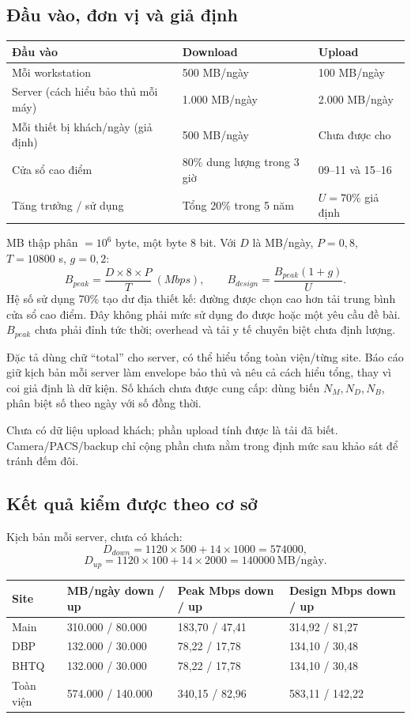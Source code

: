 \documentclass[
  11pt,
]{article}
\begin{document}
\subsection{Đầu vào, đơn vị và giả định}
\par\noindent
{}
\begin{tabularx}{\linewidth}{@{}lXX@{}}\toprule
Đầu vào & Download & Upload\\\midrule
Mỗi workstation & 500 MB/ngày & 100 MB/ngày\\
Server (cách hiểu bảo thủ mỗi máy) & 1.000 MB/ngày & 2.000 MB/ngày\\
Mỗi thiết bị khách/ngày (giả định) & 500 MB/ngày & Chưa được cho\\
Cửa sổ cao điểm & 80\% dung lượng trong 3 giờ & 09--11 và 15--16\\
Tăng trưởng / sử dụng & Tổng 20\% trong 5 năm & $U=70\%$ giả định\\\bottomrule\end{tabularx}\par

MB thập phân $=10^6$ byte, một byte 8 bit. Với $D$ là MB/ngày, $P=0,8$, $T=10800$ s, $g=0,2$:
\[B_{peak}=\frac{D\times8\times P}{T}\ (Mbps),\qquad
B_{design}=\frac{B_{peak}(1+g)}{U}.\]
Hệ số sử dụng 70\% tạo dư địa thiết kế: đường được chọn cao hơn tải trung bình cửa sổ cao điểm. Đây không phải mức sử dụng đo được hoặc một yêu cầu đề bài. $B_{peak}$ chưa phải đỉnh tức thời; overhead và tải y tế chuyên biệt chưa định lượng.

Đặc tả dùng chữ ``total'' cho server, có thể hiểu tổng toàn viện/từng site. Báo cáo giữ kịch bản mỗi server làm envelope bảo thủ và nêu cả cách hiểu tổng, thay vì coi giả định là dữ kiện. Số khách chưa được cung cấp: dùng biến $N_M,N_D,N_B$, phân biệt số theo ngày với số đồng thời.

Chưa có dữ liệu upload khách; phần upload tính được là tải đã biết. Camera/PACS/backup chỉ cộng phần chưa nằm trong định mức sau khảo sát để tránh đếm đôi.

\clearpage
\subsection{Kết quả kiểm được theo cơ sở}
Kịch bản mỗi server, chưa có khách:
\[D_{down}=1120\times500+14\times1000=574000,\]
\[D_{up}=1120\times100+14\times2000=140000\ \mathrm{MB/ngày}.\]
\par\noindent
{}
\begin{tabularx}{\linewidth}{@{}lXXX@{}}\toprule
Site & MB/ngày down / up & Peak Mbps down / up & Design Mbps down / up\\\midrule
Main & 310.000 / 80.000 & 183,70 / 47,41 & 314,92 / 81,27\\
DBP & 132.000 / 30.000 & 78,22 / 17,78 & 134,10 / 30,48\\
BHTQ & 132.000 / 30.000 & 78,22 / 17,78 & 134,10 / 30,48\\
Toàn viện & 574.000 / 140.000 & 340,15 / 82,96 & 583,11 / 142,22\\\bottomrule\end{tabularx}\par
\end{document}
